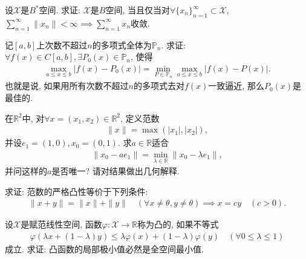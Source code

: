 \documentclass[../../main.tex]{subfiles}%
\begin{document}
\begin{example}
设$\mathscr{X}$是$B^*$空间. 求证: $\mathscr{X}$是$B$空间, 当且仅当对$\forall \{x_n\}_{n=1}^{\infty} \subset \mathscr{X}$, $\sum\limits_{n=1}^{\infty} \|x_n\| < \infty \implies \sum\limits_{n=1}^{\infty} x_n$收敛.
\end{example}

\begin{example}
记$[a, b]$上次数不超过$n$的多项式全体为$\mathbb{P}_n$. 求证: $\forall f(x) \in C[a, b], \exists P_0(x) \in \mathbb{P}_n$, 使得
\begin{align*}
\max_{a \leqslant x \leqslant b} |f(x) - P_0(x)| = \min_{P \in \mathbb{P}_n} \max_{a \leqslant x \leqslant b} |f(x) - P(x)|.
\end{align*}
也就是说, 如果用所有次数不超过$n$的多项式去对$f(x)$一致逼近, 那么$P_0(x)$是最佳的.
\end{example}

\begin{example}
在$\mathbb{R}^2$中, 对$\forall x = (x_1, x_2) \in \mathbb{R}^2$, 定义范数
\begin{align*}
\|x\| = \max(|x_1|, |x_2|),
\end{align*}
并设$e_1 = (1, 0), x_0 = (0, 1)$. 求$a \in \mathbb{R}$适合
\begin{align*}
\|x_0 - a e_1\| = \min_{\lambda \in \mathbb{R}} \|x_0 - \lambda e_1\|,
\end{align*}
并问这样的$a$是否唯一? 请对结果做出几何解释.
\end{example}

\begin{example}
求证: 范数的严格凸性等价于下列条件:
\begin{align*}
\|x + y\| = \|x\| + \|y\| \quad (\forall x \neq \theta, y \neq \theta) \implies x = c y \quad (c > 0).
\end{align*}
\end{example}

\begin{example}
设$\mathscr{X}$是赋范线性空间, 函数$\varphi: \mathscr{X} \to \mathbb{R}$称为凸的, 如果不等式
\begin{align*}
\varphi(\lambda x + (1 - \lambda) y) \leqslant \lambda \varphi(x) + (1 - \lambda) \varphi(y) \quad (\forall 0 \leqslant \lambda \leqslant 1)
\end{align*}
成立. 求证: 凸函数的局部极小值必然是全空间最小值.
\end{example}
\end{document}
